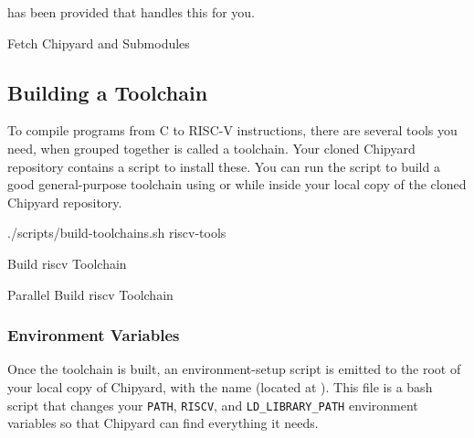  has been provided that handles this for you.

\begin{listing}[h!tbp]
\caption{Fetch Chipyard and Submodules}
\label{lst:Fetch_Chipyard_and_Submodules}
\end{listing}

\subsection{Building a Toolchain}\label{sec:Building_Toolchain}
To compile programs from C to RISC-V instructions, there are several tools you need, when grouped together is called a toolchain.
Your cloned Chipyard repository contains a script to install these.
You can run the script to build a good general-purpose toolchain using  or  while inside your local copy of the cloned Chipyard repository.

\begin{listing}[h!tbp]
\begin{bashsource}
./scripts/build-toolchains.sh riscv-tools
\end{bashsource}
\caption{Build \Gls{riscv} Toolchain}
\label{lst:Build_RISCV_Toolchain}
\end{listing}

\begin{listing}[h!tbp]
\begin{bashsource}
export MAKEFLAGS=-j[N]; ./scripts/build-toolchains.sh riscv-tools}
\end{bashsource}
\caption{Parallel Build \Gls{riscv} Toolchain}
\label{lst:Build_RISCV_Toolchain-Parallel}
\end{listing}

\subsubsection{Environment Variables}\label{sec:Environment_Variables}
Once the toolchain is built, an environment-setup script is emitted to the root of your local copy of Chipyard, with the name  (located at ).
This file is a bash script that changes your \texttt{PATH}, \texttt{RISCV}, and \texttt{LD\_LIBRARY\_PATH} environment variables so that Chipyard can find everything it needs.


